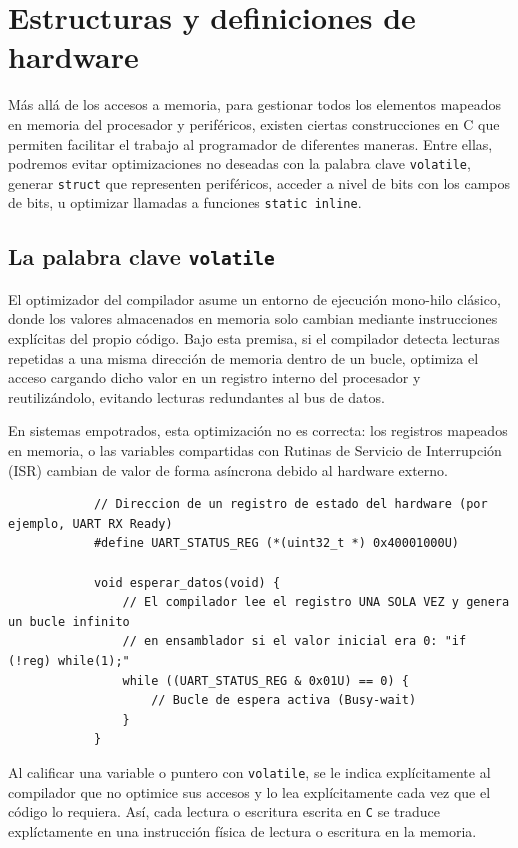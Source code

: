 \documentclass[../main.tex]{subfiles}
\begin{document}
\section{Estructuras y definiciones de hardware}

    Más allá de los accesos a memoria, para gestionar todos los elementos mapeados en memoria del procesador y periféricos, existen ciertas construcciones en C que permiten facilitar el trabajo al programador de diferentes maneras. Entre ellas, podremos evitar optimizaciones no deseadas con la palabra clave \lstinline|volatile|, generar \lstinline|struct| que representen periféricos, acceder a nivel de bits con los campos de bits, u optimizar llamadas a funciones \lstinline|static inline|.

    \subsection{La palabra clave \lstinline|volatile|}

        El optimizador del compilador asume un entorno de ejecución mono-hilo clásico, donde los valores almacenados en memoria solo cambian mediante instrucciones explícitas del propio código. Bajo esta premisa, si el compilador detecta lecturas repetidas a una misma dirección de memoria dentro de un bucle, optimiza el acceso cargando dicho valor en un registro interno del procesador y reutilizándolo, evitando lecturas redundantes al bus de datos.

        En sistemas empotrados, esta optimización no es correcta: los registros mapeados en memoria, o las variables compartidas con Rutinas de Servicio de Interrupción (ISR) cambian de valor de forma asíncrona debido al hardware externo.

        \begin{lstlisting}
            // Direccion de un registro de estado del hardware (por ejemplo, UART RX Ready)
            #define UART_STATUS_REG (*(uint32_t *) 0x40001000U)

            void esperar_datos(void) {
                // El compilador lee el registro UNA SOLA VEZ y genera un bucle infinito
                // en ensamblador si el valor inicial era 0: "if (!reg) while(1);"
                while ((UART_STATUS_REG & 0x01U) == 0) {
                    // Bucle de espera activa (Busy-wait)
                }
            }
        \end{lstlisting}

        Al calificar una variable o puntero con \lstinline|volatile|, se le indica explícitamente al compilador que no optimice sus accesos y lo lea explícitamente cada vez que el código lo requiera. Así, cada lectura o escritura escrita en \texttt{C} se traduce explíctamente en una instrucción física de lectura o escritura en la memoria.
\end{document}
